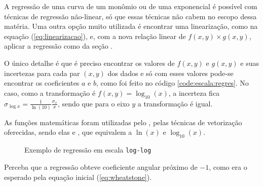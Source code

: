     A regressão de uma curva de um monômio ou de uma exponencial é possível com técnicas de regressão não-linear, só que essas técnicas não cabem no escopo dessa matéria. Uma outra opção muito utilizada é encontrar uma linearização, como na equação (\ref{eq:linearizacao}), e, com a nova relação linear de $f(x, y) \times g(x, y)$, aplicar a regressão como da seção .

    O único detalhe é que é preciso encontrar os valores de $f(x, y)$ e $g(x, y)$ e suas incertezas para cada par $(x, y)$ dos dados e só com esses valores pode-se encontrar os coeficientes $a$ e $b$, como foi feito no código \ref{code:escala:regres}. No caso, como a transformação é $f(x, y) = \log_{10}(x)$, a incerteza fica $\sigma_{\log x} = \frac{1}{\ln(10)} \frac{\sigma_x}{x}$, sendo que para o eixo $y$ a transformação é igual.

    As funções matemáticas foram utilizadas pelo \numpy, pelas técnicas de vetorização oferecidas, sendo elas  e , que equivalem a $\ln(x)$ e $\log_{10}(x)$.

    \begin{figure}[H]
        \centering
        

        \caption{Exemplo de regressão em escala \texttt{log-log}}
        \label{fig:escala:regres}
    \end{figure}

    Perceba que a regressão obteve coeficiente angular próximo de $-1$, como era o esperado pela equação inicial (\ref{eq:wheatstone}).
